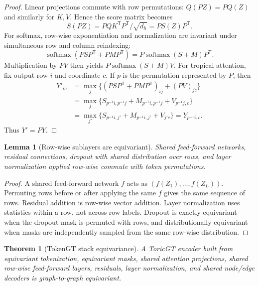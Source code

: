 \documentclass[11pt]{article}
\theoremstyle{definition}
\theoremstyle{plain}
\newtheorem{theorem}[definition]{Theorem}
\newtheorem{lemma}[definition]{Lemma}
\theoremstyle{remark}
\numberwithin{equation}{section}
\newcommand{\softmax}{\operatorname{softmax}}
\newcommand{\transpose}{^{\mathsf T}}
\begin{document}
\begin{proof}
Linear projections commute with row permutations: $Q(PZ)=PQ(Z)$ and similarly for $K,V$.  Hence the score matrix becomes
\begin{equation}
  S(PZ)=PQK\transpose P\transpose/\sqrt{d_h}=PS(Z)P\transpose.
\end{equation}
For softmax, row-wise exponentiation and normalization are invariant under simultaneous row and column reindexing:
\begin{equation}
  \softmax(PSP\transpose+PMP\transpose)=P\softmax(S+M)P\transpose.
\end{equation}
Multiplication by $PV$ then yields $P\softmax(S+M)V$.  For tropical attention, fix output row $i$ and coordinate $c$.  If $p$ is the permutation represented by $P$, then
\begin{align}
  Y'_{ic}
  &=\max_j\{(PSP\transpose+PMP\transpose)_{ij}+(PV)_{jc}\}\\
  &=\max_j\{S_{p^{-1}i,p^{-1}j}+M_{p^{-1}i,p^{-1}j}+V_{p^{-1}j,c}\}\\
  &=\max_{j'}\{S_{p^{-1}i,j'}+M_{p^{-1}i,j'}+V_{j'c}\}=Y_{p^{-1}i,c}.
\end{align}
Thus $Y'=PY$.
\end{proof}

\begin{lemma}[Row-wise sublayers are equivariant]
Shared feed-forward networks, residual connections, dropout with shared distribution over rows, and layer normalization applied row-wise commute with token permutations.
\end{lemma}

\begin{proof}
A shared feed-forward network $f$ acts as $(f(Z_1),\ldots,f(Z_L))$.  Permuting rows before or after applying the same $f$ gives the same sequence of rows.  Residual addition is row-wise vector addition.  Layer normalization uses statistics within a row, not across row labels.  Dropout is exactly equivariant when the dropout mask is permuted with rows, and distributionally equivariant when masks are independently sampled from the same row-wise distribution.
\end{proof}

\begin{theorem}[TokenGT stack equivariance]
A ToricGT encoder built from equivariant tokenization, equivariant masks, shared attention projections, shared row-wise feed-forward layers, residuals, layer normalization, and shared node/edge decoders is graph-to-graph equivariant.
\end{theorem}
\end{document}
